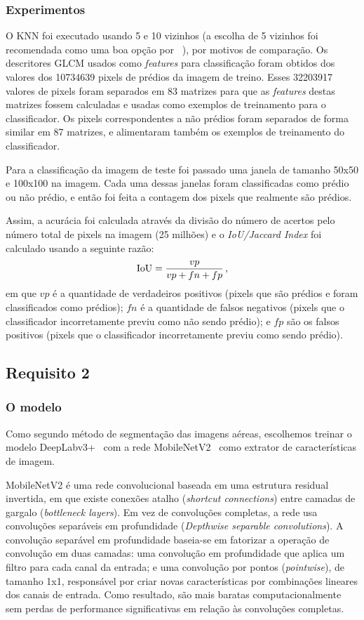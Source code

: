 \documentclass{bmvc2k}
\begin{document}
\subsubsection{Experimentos}
O KNN foi executado usando 5 e 10 vizinhos (a escolha de 5 vizinhos foi recomendada como uma boa opção por ~\cite{knn}), por motivos de comparação. Os descritores GLCM usados como \textit{features} para classificação foram obtidos dos valores dos 10734639 pixels de prédios da imagem de treino. Esses 32203917 valores de pixels foram separados em 83 matrizes para que as \textit{features} destas matrizes fossem calculadas e usadas como exemplos de treinamento para o classificador. Os pixels correspondentes a não prédios foram separados de forma similar em 87 matrizes, e alimentaram também os exemplos de treinamento do classificador. 

Para a classificação da imagem de teste foi passado uma janela de tamanho 50x50 e 100x100 na imagem. Cada uma dessas janelas foram classificadas como prédio ou não prédio, e então foi feita a contagem dos pixels que realmente são prédios. 

Assim, a acurácia foi calculada através da divisão do número de acertos pelo número total de pixels na imagem (25 milhões) e o \textit{IoU/Jaccard Index} foi calculado usando a seguinte razão: 
\begin{equation}
\centering
\text{IoU}=\frac{vp}{vp+fn+fp}\,,
\end{equation}
em que $vp$ é a quantidade de verdadeiros positivos (pixels que são prédios e foram classificados como prédios); $fn$ é a quantidade de falsos negativos (pixels que o classificador incorretamente previu como não sendo prédio); e $fp$ são os falsos positivos (pixels que o classificador incorretamente previu como sendo prédio). 
\subsection{Requisito 2}
\subsubsection{O modelo}
Como segundo método de segmentação das imagens aéreas, escolhemos treinar o modelo DeepLabv3+~\cite{deeplab} com a rede MobileNetV2~\cite{mobilenet} como extrator de características de imagem.

MobileNetV2 é uma rede convolucional baseada em uma estrutura residual invertida, em que existe conexões atalho (\textit{shortcut connections}) entre camadas de gargalo (\textit{bottleneck layers}). Em vez de convoluções completas, a rede usa convoluções separáveis em profundidade (\textit{Depthwise separable convolutions}). A convolução separável em profundidade baseia-se em fatorizar a operação de convolução em duas camadas: uma convolução em profundidade que aplica um filtro para cada canal da entrada; e uma convolução por pontos (\textit{pointwise}), de tamanho 1x1, responsável por criar novas características por combinações lineares dos canais de entrada. Como resultado, são mais baratas computacionalmente sem perdas de performance significativas em relação às convoluções completas.
\end{document}
